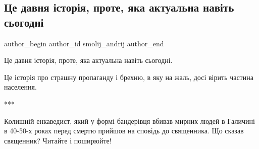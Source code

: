 
 
 
 
 
 
\subsection{Це давня історія, проте, яка актуальна навіть сьогодні}
\label{sec:29_11_2020.fb.smolij_andrij.1.davnja_istorija_nkvd}
\ifcmt
	author_begin
   author_id smolij_andrij
	author_end
\fi


Це давня історія, проте, яка актуальна навіть сьогодні. 

Це історія про страшну пропаганду і брехню, в яку на жаль, досі вірить частина населення.

***

Колишній енкаведист, який у формі бандерівця вбивав мирних людей в Галичині в
40-50-х роках перед смертю прийшов на сповідь до священника. Що сказав
священник? Читайте і поширюйте! 

